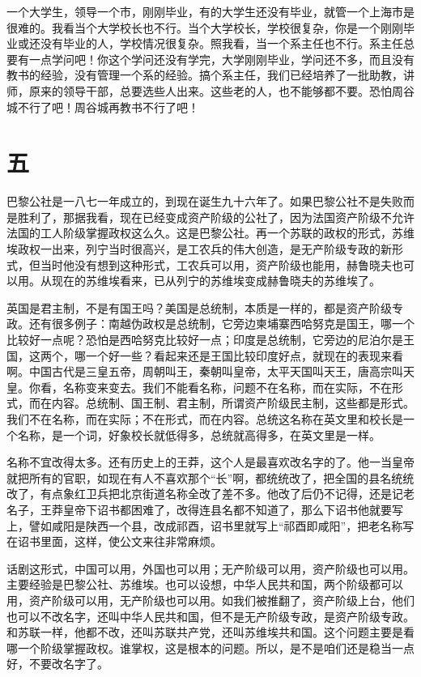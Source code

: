 一个大学生，领导一个市，刚刚毕业，有的大学生还没有毕业，就管一个上海市是很难的。我看当个大学校长也不行。当个大学校长，学校很复杂，你是一个刚刚毕业或还没有毕业的人，学校情况很复杂。照我看，当一个系主任也不行。系主任总要有一点学问吧！你这个学问还没有学完，大学刚刚毕业，学问还不多，而且没有教书的经验，没有管理一个系的经验。搞个系主任，我们已经培养了一批助教，讲师，原来的领导干部，总要选些人出来。这些老的人，也不能够都不要。恐怕周谷城不行了吧！周谷城再教书不行了吧！

\section*{五}

巴黎公社是一八七一年成立的，到现在诞生九十六年了。如果巴黎公社不是失败而是胜利了，那据我看，现在已经变成资产阶级的公社了，因为法国资产阶级不允许法国的工人阶级掌握政权这么久。这是巴黎公社。再一个苏联的政权的形式，苏维埃政权一出来，列宁当时很高兴，是工农兵的伟大创造，是无产阶级专政的新形式，但当时他没有想到这种形式，工农兵可以用，资产阶级也能用，赫鲁晓夫也可以用。从现在的苏维埃看来，已从列宁的苏维埃变成赫鲁晓夫的苏维埃了。

英国是君主制，不是有国王吗？美国是总统制，本质是一样的，都是资产阶级专政。还有很多例子：南越伪政权是总统制，它旁边柬埔寨西哈努克是国王，哪一个比较好一点呢？恐怕是西哈努克比较好一点；印度是总统制，它旁边的尼泊尔是王国，这两个，哪一个好一些？看起来还是王国比较印度好点，就现在的表现来看啊。中国古代是三皇五帝，周朝叫王，秦朝叫皇帝，太平天国叫天王，唐高宗叫天皇。你看，名称变来变去。我们不能看名称，问题不在名称，而在实际，不在形式，而在内容。总统制、国王制、君主制，所谓资产阶级民主制，这些都是形式。我们不在名称，而在实际；不在形式，而在内容。总统这名称在英文里和校长是一个名称，是一个词，好象校长就低得多，总统就高得多，在英文里是一样。

名称不宜改得太多。还有历史上的王莽，这个人是最喜欢改名字的了。他一当皇帝就把所有的官职，如现在有人不喜欢那个“长”啊，都统统改了，把全国的县名统统改了，有点象红卫兵把北京街道名称全改了差不多。他改了后仍不记得，还是记老名子，王莽皇帝下诏书都困难了，改得连县名都不知道了，那么下诏书他就要写上，譬如咸阳是陕西一个县，改成祁酉，诏书里就写上“祁酉即咸阳”，把老名称写在诏书里面，这样，使公文来往非常麻烦。

话剧这形式，中国可以用，外国也可以用；无产阶级可以用，资产阶级也可以用。主要经验是巴黎公社、苏维埃。也可以设想，中华人民共和国，两个阶级都可以用，资产阶级可以用，无产阶级也可以用。如我们被推翻了，资产阶级上台，他们也可以不改名字，还叫中华人民共和国，但不是无产阶级专政，是资产阶级专政。和苏联一样，他都不改，还叫苏联共产党，还叫苏维埃共和国。这个问题主要是看哪一个阶级掌握政权。谁掌权，这是根本的问题。所以，是不是咱们还是稳当一点好，不要改名字了。

